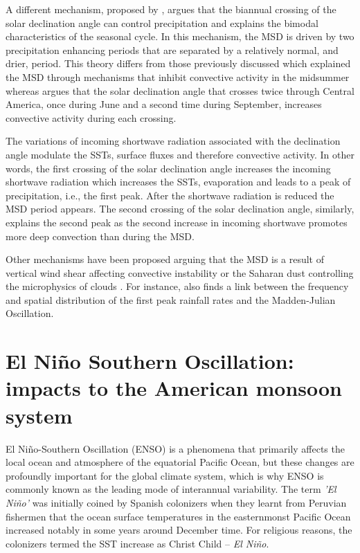 A different mechanism, proposed by \cite{karnauskas2013}, argues that the biannual crossing of the solar declination angle can control precipitation and explains the bimodal characteristics of the seasonal cycle. In this mechanism, the MSD is driven by two precipitation enhancing periods that are separated by a relatively normal, and drier, period. This theory differs from those previously discussed which explained the MSD through mechanisms that inhibit convective activity in the midsummer whereas \cite{karnauskas2013} argues that the solar declination angle that crosses twice through Central America, once during June and a second time during September, increases convective activity during each crossing. 

The variations of incoming shortwave radiation associated with the declination angle modulate the SSTs, surface fluxes and therefore convective activity. In other words, the first crossing of the solar declination angle increases the incoming shortwave radiation which increases the SSTs, evaporation and leads to a peak of precipitation, i.e., the first peak. After the shortwave radiation is reduced the MSD period appears. The second crossing of the solar declination angle, similarly, explains the second peak as the second increase in incoming shortwave promotes more deep convection than during the MSD. 



Other mechanisms have been proposed arguing that the MSD is a result of vertical wind shear affecting convective instability or the Saharan dust controlling  the microphysics of clouds \citep{angeles2010origins}.
For instance, \cite{perdigon2019} also finds a link between the frequency and spatial distribution of the first peak rainfall rates and the Madden-Julian Oscillation. 

\section{El Niño Southern Oscillation: impacts to the American monsoon system}
\label{sub:lit_enso}



 El Niño-Southern Oscillation (ENSO) is a phenomena that primarily affects the local ocean and atmosphere of the equatorial Pacific Ocean, but these changes are profoundly important for the global climate system, which is why ENSO is commonly known as the leading mode of interannual variability. 
 The term \textit{'El Niño'} was initially coined by Spanish colonizers when they learnt from Peruvian fishermen that the ocean surface temperatures in the easternmonst Pacific Ocean increased notably in some years around December time. 
 For religious reasons, the colonizers termed the SST increase as Christ Child -- \textit{El Niño}. 
 
